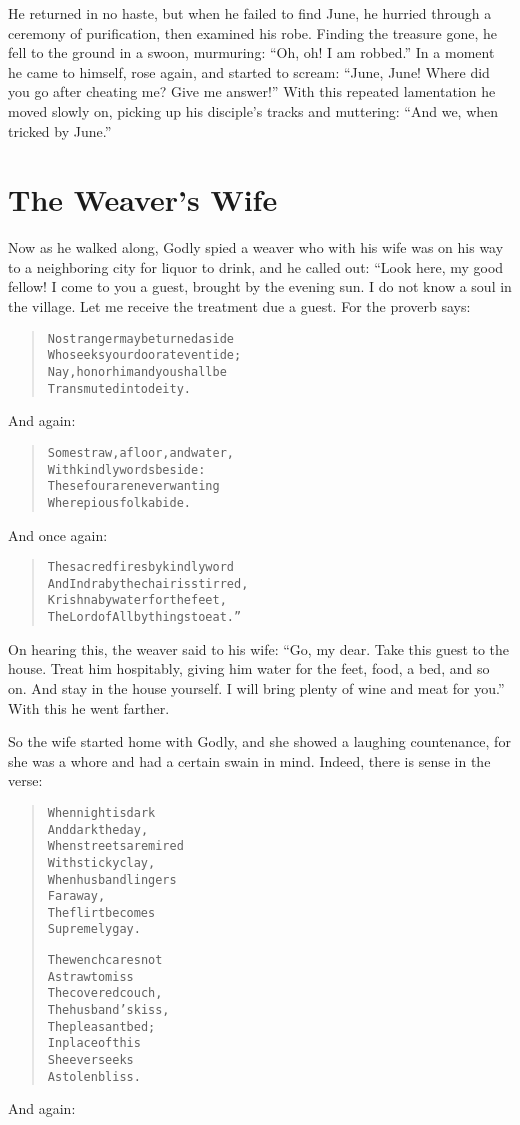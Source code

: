 \documentclass[article, twoside, 14pt]{memoir}
\renewenvironment{verbatim}{%
\begin{quote}%
\vskip -10pt%
\begin{alltt}\normalfont\large}{\end{alltt}%
\end{quote}%
\vskip -10pt
} %
\begin{document}
He returned in no haste, but when he failed to find June, he
hurried through a ceremony of purification, then examined his robe.
Finding the treasure gone, he fell to the ground in a swoon,
murmuring: ``Oh, oh! I am robbed.'' In a moment he came to himself,
rose again, and started to scream:
``June, June! Where did you go after cheating me? Give me answer!''
With this repeated lamentation he moved slowly on, picking up his
disciple's tracks and muttering: ``And we, when tricked by June.''

\chapter{The Weaver's Wife}

\label{s7}

Now as he walked along, Godly spied a weaver who with his wife was
on his way to a neighboring city for liquor to drink, and he called
out: “Look here, my good fellow! I come to you a guest, brought by
the evening sun. I do not know a soul in the village. Let me
receive the treatment due a guest. For the proverb says:

\begin{verbatim}
No stranger may be turned aside
Who seeks your door at eventide;
Nay, honor him and you shall be
Transmuted into deity.
\end{verbatim}
And again:

\begin{verbatim}
Some straw, a floor, and water,
    With kindly words beside:
These four are never wanting
    Where pious folk abide.
\end{verbatim}
And once again:

\begin{verbatim}
The sacred fires by kindly word
And Indra by the chair is stirred,
Krishna by water for the feet,
The Lord of All by things to eat.”
\end{verbatim}
On hearing this, the weaver said to his wife:
``Go, my dear. Take this guest to the house. Treat him hospitably, giving him water for the feet, food, a bed, and so on. And stay in the house yourself. I will bring plenty of wine and meat for you.''
With this he went farther.

So the wife started home with Godly, and she showed a laughing
countenance, for she was a whore and had a certain swain in mind.
Indeed, there is sense in the verse:

\begin{verbatim}
When night is dark
    And dark the day,
When streets are mired
    With sticky clay,
When husband lingers
    Far away,
The flirt becomes
    Supremely gay.

The wench cares not
    A straw to miss
The covered couch,
    The husband's kiss,
The pleasant bed;
    In place of this
She ever seeks
    A stolen bliss.
\end{verbatim}
And again:
\end{document}
